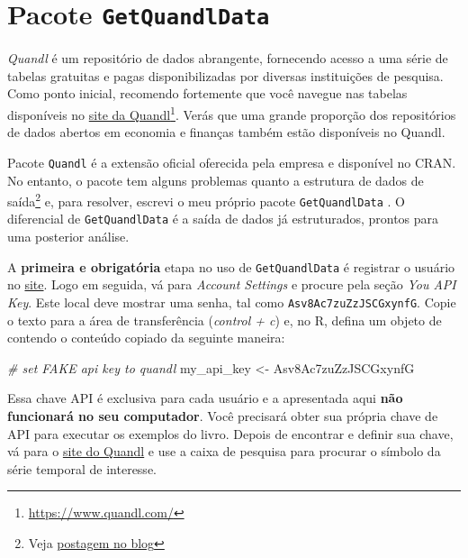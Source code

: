 \documentclass[
  11pt,
]{book}
\newenvironment{Shaded}{\begin{snugshade}}{\end{snugshade}}
\newcommand{\CommentTok}[1]{\textcolor[rgb]{0.37,0.37,0.37}{\textit{#1}}}
\newcommand{\NormalTok}[1]{#1}
\newcommand{\OtherTok}[1]{\textcolor[rgb]{0.37,0.37,0.37}{#1}}
\newcommand{\StringTok}[1]{\textcolor[rgb]{0.5,0.5,0.5}{#1}}
\begin{document}
\hypertarget{quandl}{%
\section{\texorpdfstring{Pacote \texttt{GetQuandlData}}{Pacote GetQuandlData}}\label{quandl}}

\emph{Quandl} é um repositório de dados abrangente, fornecendo acesso a uma série de tabelas gratuitas e pagas disponibilizadas por diversas instituições de pesquisa. Como ponto inicial, recomendo fortemente que você navegue nas tabelas disponíveis no \href{https://www.quandl.com/}{site da Quandl}\footnote{\url{https://www.quandl.com/}}. Verás que uma grande proporção dos repositórios de dados abertos em economia e finanças também estão disponíveis no Quandl. 

Pacote \texttt{Quandl} \citep{R-Quandl} é a extensão oficial oferecida pela empresa e disponível no CRAN. No entanto, o pacote tem alguns problemas quanto a estrutura de dados de saída\footnote{Veja \href{https://www.msperlin.com/blog/post/2019-10-01-new-package-getquandldata/}{postagem no blog}} e, para resolver, escrevi o meu próprio pacote \texttt{GetQuandlData} \citep{R-GetQuandlData}. O diferencial de \texttt{GetQuandlData} é a saída de dados já estruturados, prontos para uma posterior análise.

A \textbf{primeira e obrigatória} etapa no uso de \texttt{GetQuandlData} é registrar o usuário no \href{https://www.quandl.com/}{site}. Logo em seguida, vá para \emph{Account Settings} e procure pela seção \emph{You API Key}. Este local deve mostrar uma senha, tal como \texttt{Asv8Ac7zuZzJSCGxynfG}. Copie o texto para a área de transferência (\emph{control + c}) e, no R, defina um objeto de contendo o conteúdo copiado da seguinte maneira:

\begin{Shaded}
\begin{Highlighting}[]
\CommentTok{\# set FAKE api key to quandl}
\NormalTok{my\_api\_key }\OtherTok{\textless{}{-}} \StringTok{\textquotesingle{}Asv8Ac7zuZzJSCGxynfG\textquotesingle{}}
\end{Highlighting}
\end{Shaded}

Essa chave API é exclusiva para cada usuário e a apresentada aqui \textbf{não funcionará no seu computador}. Você precisará obter sua própria chave de API para executar os exemplos do livro. Depois de encontrar e definir sua chave, vá para o \href{https://www.quandl.com/search}{site do Quandl} e use a caixa de pesquisa para procurar o símbolo da série temporal de interesse.
\end{document}
